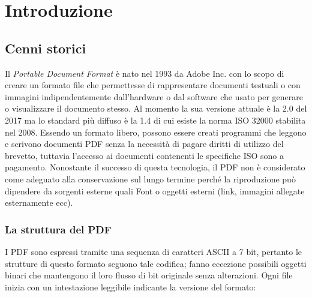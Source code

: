 \chapter{Introduzione}
\section{Cenni storici}
Il \textit{Portable Document Format} è nato nel 1993 da Adobe Inc. con lo scopo di creare un formato file che permettesse di rappresentare documenti testuali o con immagini indipendentemente dall'hardware o dal software che usato per generare o visualizzare il documento stesso. Al momento la sua versione attuale è la 2.0 del 2017 ma lo standard più diffuso è la 1.4 di cui esiste la norma ISO 32000 stabilita nel 2008.
Essendo un formato libero, possono essere creati programmi che leggono e scrivono documenti PDF senza la necessità di pagare diritti di utilizzo del brevetto, tuttavia l'accesso ai documenti contenenti le specifiche ISO sono a pagamento.
Nonostante il successo di questa tecnologia, il PDF non è considerato come adeguato alla conservazione sul lungo termine perché la riproduzione può dipendere da sorgenti esterne quali Font o oggetti esterni (link, immagini allegate esternamente ecc).
\par\bigskip
\subsection{La struttura del PDF}
I PDF sono espressi tramite una sequenza di caratteri ASCII a 7 bit, pertanto le strutture di questo formato seguono tale codifica; fanno eccezione possibili oggetti binari che mantengono il loro flusso di bit originale senza alterazioni.
Ogni file inizia con un intestazione leggibile indicante la versione del formato:
\begin{center}
\begin{lstlisting}[language=C]
			%PDF-1.4	
\end{lstlisting}
\end{center}

